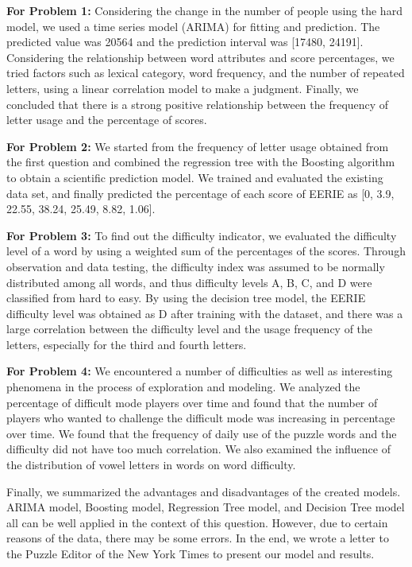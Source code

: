 \documentclass[12pt]{article}
\begin{document}
\textbf{For Problem 1:} Considering the change in the number of people using the hard model, we used a time series model (ARIMA) for fitting and prediction. 
The predicted value was 20564 and the prediction interval was [17480, 24191]. Considering the relationship between word attributes and score percentages, we tried factors such as lexical category, word frequency, and the number of repeated letters, using a linear correlation model to make a judgment. 
Finally, we concluded that there is a strong positive relationship between the frequency of letter usage and the percentage of scores.


\textbf{For Problem 2:} We started from the frequency of letter usage obtained from the first question and combined the regression tree with the Boosting algorithm to obtain a scientific prediction model. We trained and evaluated the existing data set, and finally predicted the percentage of each score of EERIE as [0, 3.9, 22.55, 38.24, 25.49, 8.82, 1.06].



\textbf{For Problem 3:} To find out the difficulty indicator, we evaluated the difficulty level of a word by using a weighted sum of the percentages of the scores. Through observation and data testing, the difficulty index was assumed to be normally distributed among all words, and thus difficulty levels A, B, C, and D were classified from hard to easy.
By using the decision tree model, the EERIE difficulty level was obtained as D after training with the dataset, and there was a large correlation between the difficulty level and the usage frequency of the letters, especially for the third and fourth letters. 

\textbf{For Problem 4:} 
We encountered a number of difficulties as well as interesting phenomena in the process of exploration and modeling. We analyzed the percentage of difficult mode players over time and found that the number of players who wanted to challenge the difficult mode was increasing in percentage over time. We found that the frequency of daily use of the puzzle words and the difficulty did not have too much correlation. We also examined the influence of the distribution of vowel letters in words on word difficulty.

Finally, we summarized the advantages and disadvantages of the created models.
ARIMA model, Boosting model, Regression Tree model, and Decision Tree model all can be well applied in the context of this question. 
However, due to certain reasons of the data, there may be some errors. 
In the end, we wrote a letter to the Puzzle Editor of the New York Times to present our model and results.
\end{document}
